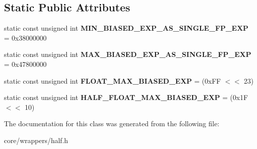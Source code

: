\subsection*{Static Public Attributes}
\begin{DoxyCompactItemize}
\item 
\hypertarget{class_tempest_1_1_half_a0dd56ae8eedd8a0f63579e06c133c9b5}{static const unsigned int {\bfseries M\+I\+N\+\_\+\+B\+I\+A\+S\+E\+D\+\_\+\+E\+X\+P\+\_\+\+A\+S\+\_\+\+S\+I\+N\+G\+L\+E\+\_\+\+F\+P\+\_\+\+E\+X\+P} = 0x38000000}\label{class_tempest_1_1_half_a0dd56ae8eedd8a0f63579e06c133c9b5}

\item 
\hypertarget{class_tempest_1_1_half_a0d9498ac5d299c34fdf0ea97016f4160}{static const unsigned int {\bfseries M\+A\+X\+\_\+\+B\+I\+A\+S\+E\+D\+\_\+\+E\+X\+P\+\_\+\+A\+S\+\_\+\+S\+I\+N\+G\+L\+E\+\_\+\+F\+P\+\_\+\+E\+X\+P} = 0x47800000}\label{class_tempest_1_1_half_a0d9498ac5d299c34fdf0ea97016f4160}

\item 
\hypertarget{class_tempest_1_1_half_a169211a32cc92672c655a9a120e5d2a0}{static const unsigned int {\bfseries F\+L\+O\+A\+T\+\_\+\+M\+A\+X\+\_\+\+B\+I\+A\+S\+E\+D\+\_\+\+E\+X\+P} = (0x\+F\+F $<$$<$ 23)}\label{class_tempest_1_1_half_a169211a32cc92672c655a9a120e5d2a0}

\item 
\hypertarget{class_tempest_1_1_half_a4b318c4fd28a8d725c62e7c5427a71ae}{static const unsigned int {\bfseries H\+A\+L\+F\+\_\+\+F\+L\+O\+A\+T\+\_\+\+M\+A\+X\+\_\+\+B\+I\+A\+S\+E\+D\+\_\+\+E\+X\+P} = (0x1\+F $<$$<$ 10)}\label{class_tempest_1_1_half_a4b318c4fd28a8d725c62e7c5427a71ae}

\end{DoxyCompactItemize}


The documentation for this class was generated from the following file\+:\begin{DoxyCompactItemize}
\item 
core/wrappers/half.\+h\end{DoxyCompactItemize}
